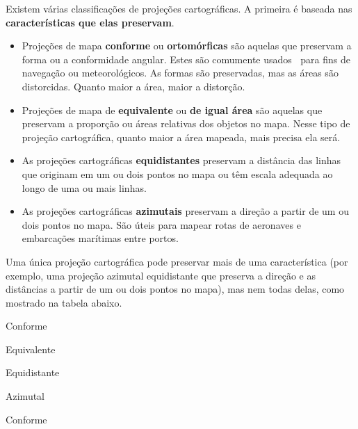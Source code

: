\documentclass[
]{book}
\providecommand{\tightlist}{%
  \setlength{\itemsep}{0pt}\setlength{\parskip}{0pt}}
\theoremstyle{definition}
\theoremstyle{definition}
\theoremstyle{definition}
\theoremstyle{definition}
\theoremstyle{remark}
\begin{document}
Existem várias classificações de projeções cartográficas. A primeira é baseada nas \textbf{características que elas preservam}.

\begin{itemize}
\tightlist
\item
  Projeções de mapa \textbf{conforme} ou \textbf{ortomórficas} são aquelas que preservam a forma ou a conformidade angular. Estes são comumente usados para fins de navegação ou meteorológicos. As formas são preservadas, mas as áreas são distorcidas. Quanto maior a área, maior a distorção.
\item
  Projeções de mapa de \textbf{equivalente} ou \textbf{de igual área} são aquelas que preservam a proporção ou áreas relativas dos objetos no mapa. Nesse tipo de projeção cartográfica, quanto maior a área mapeada, mais precisa ela será.
\item
  As projeções cartográficas \textbf{equidistantes} preservam a distância das linhas que originam em um ou dois pontos no mapa ou têm escala adequada ao longo de uma ou mais linhas.
\item
  As projeções cartográficas \textbf{azimutais} preservam a direção a partir de um ou dois pontos no mapa. São úteis para mapear rotas de aeronaves e embarcações marítimas entre portos.
\end{itemize}

Uma única projeção cartográfica pode preservar mais de uma característica (por exemplo, uma projeção azimutal equidistante que preserva a direção e as distâncias a partir de um ou dois pontos no mapa), mas nem todas delas, como mostrado na tabela abaixo.

Conforme

Equivalente

Equidistante

Azimutal

Conforme
\end{document}
